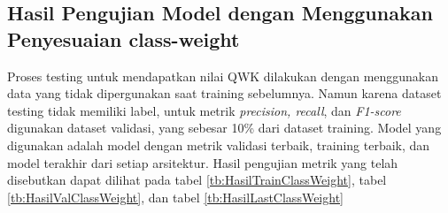 \subsection{Hasil Pengujian Model dengan Menggunakan Penyesuaian class-weight}
\label{sec:412}
Proses testing untuk mendapatkan nilai QWK dilakukan dengan menggunakan data yang tidak dipergunakan saat training sebelumnya. Namun karena dataset testing tidak memiliki label, untuk metrik \emph{precision, recall}, dan \emph{F1-score} digunakan dataset validasi, yang sebesar 10\% dari dataset training. Model yang digunakan adalah model dengan metrik validasi terbaik, training terbaik, dan model terakhir dari setiap arsitektur.  Hasil pengujian metrik yang telah disebutkan dapat dilihat pada tabel \ref{tb:HasilTrainClassWeight}, tabel \ref{tb:HasilValClassWeight}, dan tabel \ref{tb:HasilLastClassWeight}
